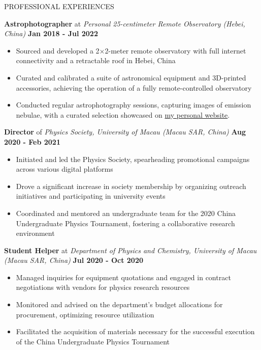 \documentclass[10pt]{article} %
\begin{document}
\begin{section}{PROFESSIONAL EXPERIENCES}

\textbf{Astrophotographer} at \textit{Personal 25-centimeter Remote Observatory (Hebei, China)} \hfill \textbf{Jan 2018 - Jul 2022} 
\begin{itemize}[leftmargin=1.5em]
    \item Sourced and developed a 2$\times$2-meter remote observatory with full internet connectivity and a retractable roof in Hebei, China
    \item Curated and calibrated a suite of astronomical equipment and 3D-printed accessories, achieving the operation of a fully remote-controlled observatory
    \item Conducted regular astrophotography sessions, capturing images of emission nebulae, with a curated selection showcased on \href{https://cheysen.fit/astrophotography/}{my personal website}. 
\end{itemize}

\textbf{Director} of \textit{Physics Society, University of Macau (Macau SAR, China)} \hfill \textbf{Aug 2020 - Feb 2021} 
\begin{itemize}[leftmargin=1.5em]
    \item Initiated and led the Physics Society, spearheading promotional campaigns across various digital platforms
    \item Drove a significant increase in society membership by organizing outreach initiatives and participating in university events
    \item Coordinated and mentored an undergraduate team for the 2020 China Undergraduate Physics Tournament, fostering a collaborative research environment
\end{itemize}

\textbf{Student Helper} at \textit{Department of Physics and Chemistry, University of Macau (Macau SAR, China)} \hfill \textbf{Jul 2020 - Oct 2020} 
\begin{itemize}[leftmargin=1.5em]
    \item Managed inquiries for equipment quotations and engaged in contract negotiations with vendors for physics research resources
    \item Monitored and advised on the department’s budget allocations for procurement, optimizing resource utilization
    \item Facilitated the acquisition of materials necessary for the successful execution of the China Undergraduate Physics Tournament
\end{itemize}


\end{section}
\end{document}
